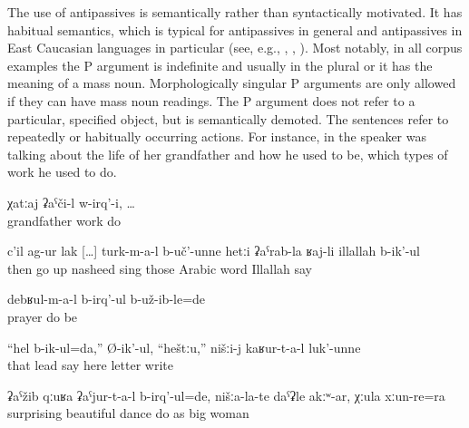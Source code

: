 The use of antipassives is semantically rather than syntactically motivated. It has habitual semantics, which is typical for antipassives in general and antipassives in East Caucasian languages in particular  (see, e.g., \citealp{vandenBergManuscript}, \citealp{Tatevosov2011}, \citealp{ComrieEtAlXXXX}). Most notably, in all corpus examples the P argument is indefinite and usually in the plural or it has the meaning of a mass noun. Morphologically singular P arguments are only allowed if they can have mass noun readings. The P argument does not refer to a particular, specified object, but is semantically demoted. The sentences refer to repeatedly or habitually occurring actions. For instance, in  the speaker was talking about the life of her grandfather and how he used to be, which types of work he used to do.
%
\begin{exe}
	\ex	\label{ex:Grandfather used to work}
	\gll	χatːaj	ʡaˁči-l	w-irq'-i, \ldots\\
		grandfather	work	do\\
	\glt	{}

	\ex	\label{ex:‎The bandits went upwards, singing anasheed in Arabic}
	\gll	c'il	ag-ur	lak [\ldots]	turk-m-a-l	b-uč'-unne	hetːi	ʡaˁrab-la	ʁaj-li		illallah	b-ik'-ul\\
		then	go	up	{}	nasheed	sing	those	Arabic	word	Illallah		say\\
	\glt	{}

	\ex	\label{ex:They were apparently praying}
	\gll	debʁul-m-a-l	b-irq'-ul	b-už-ib-le=de\\
		prayer	do	be\\
	\glt	{}

	\ex	\label{ex:‎Saying I drive that, here, he was writing letters to us}
	\gll	``hel	b-ik-ul=da,''	Ø-ik'-ul,	``heštːu,''		nišːi-j	kaʁur-t-a-l	luk'-unne\\
		that	lead	say	here		letter	write\\
	\glt	{}

	\ex	\label{ex:‎They were dancing surprisingly beautifully, not like our (women), (and they were) also elderly women}
	\gll	ʡaˁžib	qːuʁa	ʡaˁjur-t-a-l	b-irq'-ul=de,	nišːa-la-te	daˁʡle	akːʷ-ar,	χːula	xːun-re=ra\\
		surprising	beautiful	dance	do	 	as		big	woman\\
	\glt	{}
\end{exe}

